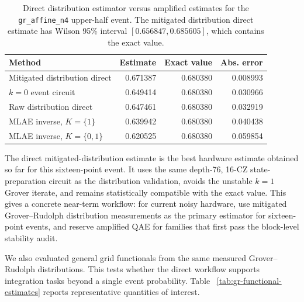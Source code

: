 \begin{table}[h]
\centering
\begin{tabular}{lrrr}
\toprule
Method & Estimate & Exact value & Abs. error \\
\midrule
Mitigated distribution direct & 0.671387 & 0.680380 & 0.008993 \\
\(k=0\) event circuit & 0.649414 & 0.680380 & 0.030966 \\
Raw distribution direct & 0.647461 & 0.680380 & 0.032919 \\
MLAE inverse, \(K=\{1\}\) & 0.639942 & 0.680380 & 0.040438 \\
MLAE inverse, \(K=\{0,1\}\) & 0.620525 & 0.680380 & 0.059854 \\
\bottomrule
\end{tabular}
\caption{Direct distribution estimator versus amplified estimates for the
\texttt{gr\_affine\_n4} upper-half event. The mitigated distribution direct
estimate has Wilson 95\% interval \([0.656847,0.685605]\), which contains the
exact value.}
\label{tab:gr-direct-estimator}
\end{table}

The direct mitigated-distribution estimate is the best hardware estimate
obtained so far for this sixteen-point event. It uses the same depth-76,
16-CZ state-preparation circuit as the distribution validation, avoids the
unstable \(k=1\) Grover iterate, and remains statistically compatible with the
exact value. This gives a concrete near-term workflow: for current noisy
hardware, use mitigated Grover--Rudolph distribution measurements as the
primary estimator for sixteen-point events, and reserve amplified QAE for
families that first pass the block-level stability audit.

We also evaluated general grid functionals from the same measured
Grover--Rudolph distributions. This tests whether the direct workflow supports
integration tasks beyond a single event probability. Table
~\ref{tab:gr-functional-estimates} reports representative quantities of
interest.

